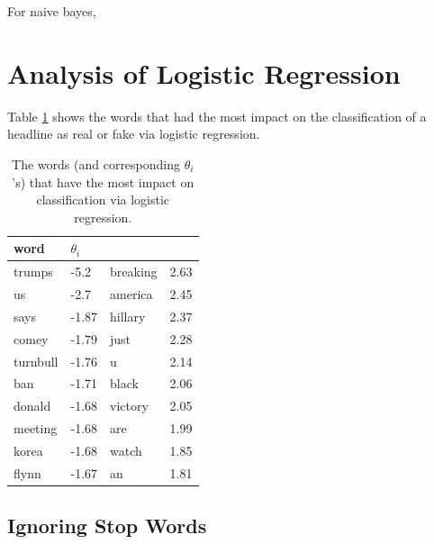 \documentclass{article}
\renewcommand{\arraystretch}{1.25}
\begin{document}
   For naive bayes,



   \section{Analysis of Logistic Regression}
   Table \ref{part6table} shows the words that had the most impact on the classification of a headline
   as real or fake via logistic regression.

   \begin{table}[h]
      \centering
      \renewcommand{\arraystretch}{1.5}

      \begin{tabular}{ p{7em}|l || p{7em}|l }
         \hline
         word     &     $\theta_i$      \\
         \hline \hline
         trumps      &     -5.2        &  breaking    & 2.63    \\
         us          &     -2.7        &  america     & 2.45    \\
         says        &     -1.87       &  hillary     & 2.37    \\
         comey       &     -1.79       &  just        & 2.28    \\
         turnbull    &     -1.76       &  u           & 2.14    \\
         ban         &     -1.71       &  black       & 2.06    \\
         donald      &     -1.68       &  victory     & 2.05    \\
         meeting     &     -1.68       &  are         & 1.99    \\
         korea       &     -1.68       &  watch       & 1.85    \\
         flynn       &     -1.67       &  an          & 1.81    \\
         \hline
      \end{tabular}

      \caption{ The words (and corresponding $\theta_i$'s) that have the most impact
               on classification via logistic regression.}
      \label{part6table}
   \end{table}


   \subsection{Ignoring Stop Words}
\end{document}
